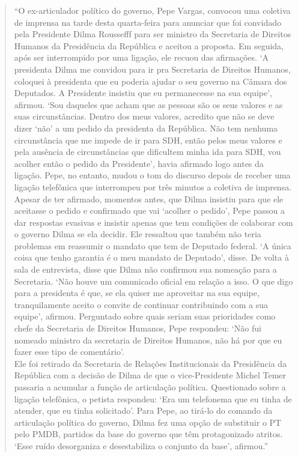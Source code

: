 \begin{quote}
``O ex-articulador político do governo, Pepe Vargas, convocou uma
coletiva de imprensa na tarde desta quarta-feira para anunciar que foi
convidado pela Presidente Dilma Roussefff para ser ministro da
Secretaria de Direitos Humanos da Presidência da República e aceitou a
proposta. Em seguida, após ser interrompido por uma ligação, ele recuou
das afirmações. `A presidenta Dilma me convidou para ir pra Secretaria
de Direitos Humanos, coloquei à presidenta que eu poderia ajudar o seu
governo na Câmara dos Deputados. A Presidente insistiu que eu
permanecesse na sua equipe', afirmou. `Sou daqueles que acham que as
pessoas são os seus valores e as suas circunstâncias. Dentro dos meus
valores, acredito que não se deve dizer `não' a um pedido da presidenta
da República. Não tem nenhuma circunstância que me impede de ir para
SDH, então pelos meus valores e pela ausência de circunstâncias que
dificultem minha ida para SDH, vou acolher então o pedido da
Presidente', havia afirmado logo antes da ligação. Pepe, no entanto,
mudou o tom do discurso depois de receber uma ligação telefônica que
interrompeu por três minutos a coletiva de imprensa. Apesar de ter
afirmado, momentos antes, que Dilma insistiu para que ele aceitasse o
pedido e confirmado que vai `acolher o pedido', Pepe passou a dar
respostas evasivas e insistir apenas que tem condições de colaborar com
o governo Dilma se ela decidir. Ele ressaltou que também não teria
problemas em reassumir o mandato que tem de Deputado federal. `A única
coisa que tenho garantia é o meu mandato de Deputado', disse. De volta à
sala de entrevista, disse que Dilma não confirmou sua nomeação para a
Secretaria. `Não houve um comunicado oficial em relação a isso. O que
digo para a presidenta é que, se ela quiser me aproveitar na sua equipe,
tranquilamente aceito o convite de continuar contribuindo com a sua
equipe', afirmou. Perguntado sobre quais seriam suas prioridades como
chefe da Secretaria de Direitos Humanos, Pepe respondeu: `Não fui
nomeado ministro da secretaria de Direitos Humanos, não há por que eu
fazer esse tipo de comentário'.\\Ele foi retirado da Secretaria de
Relações Institucionais da Presidência da República com a decisão de
Dilma de que o vice-Presidente Michel Temer passaria a acumular a função
de articulação política. Questionado sobre a ligação telefônica, o
petista respondeu: `Era um telefonema que eu tinha de atender, que eu
tinha solicitado'. Para Pepe, ao tirá-lo do comando da articulação
política do governo, Dilma fez uma opção de substituir o PT pelo PMDB,
partidos da base do governo que têm protagonizado atritos. `Esse ruído
desorganiza e desestabiliza o conjunto da base', afirmou.''
\end{quote}


